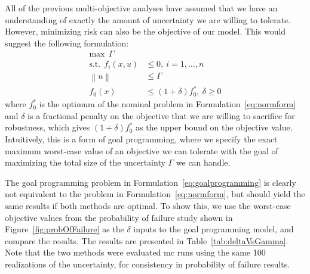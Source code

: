 All of the previous multi-objective analyses have assumed that we have an
understanding of exactly the amount of uncertainty we are
willing to tolerate. However, minimizing risk can also be the objective of our
model. This would suggest the following formulation:
\begin{equation}
    \begin{split}
    \text{max}~~\Gamma \\
    \text{s.t.}~~f_i(x,u) &\leq 0,~i = 1,\ldots,n \\
                    \left\lVert u \right\rVert &\leq \Gamma \\
                    f_0(x) &\leq (1+\delta)f_0^*,~\delta \geq 0
    \end{split}
    \label{eq:goalprogramming}
\end{equation}
where $f_0^*$ is the optimum of the nominal problem in Formulation~\ref{eq:normform} and $\delta$
is a fractional penalty on the objective that we are willing to sacrifice for robustness, which
gives $(1+\delta)f_0^*$ as the upper bound on the objective value. Intuitively,
this is a form of goal programming,
where we specify the exact maximum worst-case value of an objective we can tolerate with
the goal of maximizing the total size of the uncertainty $\Gamma$ we can handle.

The goal programming problem in Formulation~\ref{eq:goalprogramming} is clearly
not equivalent to the problem in Formulation~\ref{eq:normform},
but should yield the same results if both methods are optimal.
To show this, we use the worst-case objective values from the probability of failure study
shown in Figure~\ref{fig:probOfFailure} as the $\delta$ inputs to the goal programming model, and compare the results.
The results are presented in
Table~\ref{tab:deltaVsGamma}. Note that the two methods were evaluated \gls{mc} runs using the same 100 realizations
of the uncertainty, for consistency in probability of failure results.

